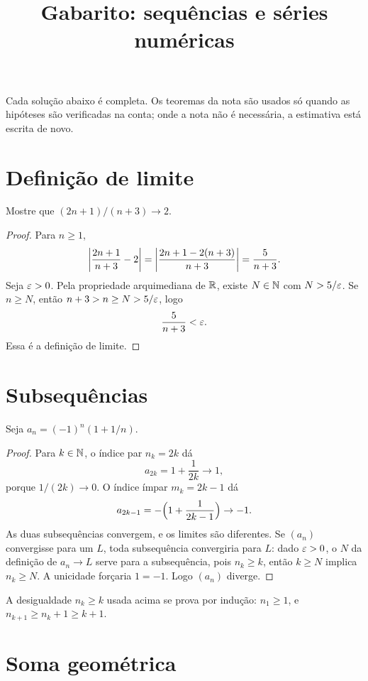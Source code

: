 \documentclass[11pt,a4paper]{article}
\title{Gabarito: sequências e séries numéricas}
\author{}
\date{}
\begin{document}
\maketitle
\tableofcontents

Cada solução abaixo é completa. Os teoremas da nota são usados só quando as hipóteses são verificadas na conta; onde a nota não é necessária, a estimativa está escrita de novo.

\section{Definição de limite}

Mostre que \((2n+1)/(n+3)\to 2\).

\begin{proof}
Para \(n\ge 1\),
\[
\left\lvert \frac{2n+1}{n+3}-2 \right\rvert
=\left\lvert \frac{2n+1-2(n+3)}{n+3} \right\rvert
=\frac{5}{n+3}.
\]
Seja \(\varepsilon>0\). Pela propriedade arquimediana de \(\mathbb{R}\), existe \(N\in\mathbb{N}\) com \(N>5/\varepsilon\). Se \(n\ge N\), então \(n+3>n\ge N>5/\varepsilon\), logo
\[
\frac{5}{n+3}<\varepsilon.
\]
Essa é a definição de limite.
\end{proof}

\section{Subsequências}

Seja \(a_n=(-1)^n(1+1/n)\).

\begin{proof}
Para \(k\in\mathbb{N}\), o índice par \(n_k=2k\) dá
\[
a_{2k}=1+\frac{1}{2k}\to 1,
\]
porque \(1/(2k)\to 0\). O índice ímpar \(m_k=2k-1\) dá
\[
a_{2k-1}=-\Bigl(1+\frac{1}{2k-1}\Bigr)\to -1.
\]
As duas subsequências convergem, e os limites são diferentes. Se \((a_n)\) convergisse para um \(L\), toda subsequência convergiria para \(L\): dado \(\varepsilon>0\), o \(N\) da definição de \(a_n\to L\) serve para a subsequência, pois \(n_k\ge k\), então \(k\ge N\) implica \(n_k\ge N\). A unicidade forçaria \(1=-1\). Logo \((a_n)\) diverge.
\end{proof}

A desigualdade \(n_k\ge k\) usada acima se prova por indução: \(n_1\ge 1\), e \(n_{k+1}\ge n_k+1\ge k+1\).

\section{Soma geométrica}
\end{document}
